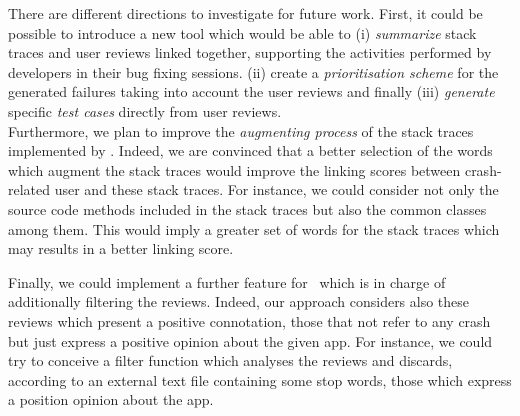 There are different directions to investigate for future work. 
First, it could be possible to introduce a new tool which would be able to (i) \textit{summarize} stack
traces and user reviews linked together, supporting the activities performed by developers in their bug fixing sessions. 
(ii) create a \textit{prioritisation scheme} for the generated failures taking into account the user reviews and finally (iii) \textit{generate} specific \textit{test cases} directly from user reviews. \\
Furthermore, we plan to improve the \textit{augmenting process} of the stack traces implemented by \toolname. 
Indeed, we are convinced that a better selection of the words which augment the stack traces would improve the linking scores between crash-related user and these stack traces. 
For instance, we could consider not only the source code methods included in the stack traces but also the common classes among them. 
This would imply a greater set of words for the stack traces which may results in a better linking score. 


Finally, we could implement a further feature for \toolname\, which is in charge of additionally  filtering the reviews. 
Indeed, our approach considers also these reviews which present a positive connotation, \ie those that not refer to any crash but just express a positive opinion about the given app. 
For instance, we could try to conceive a filter function which analyses the reviews and discards, according to an external text file containing some stop words, those which express a position opinion about the app. 		






 